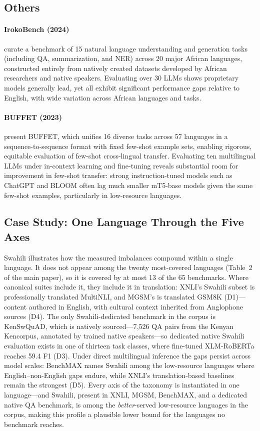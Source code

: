 \documentclass[letterpaper]{article}
\begin{document}
\subsection{Others}

\paragraph{IrokoBench (2024)} \citet{adelani2024irokobench} curate a benchmark of 15 natural language understanding and generation tasks (including QA, summarization, and NER) across 20 major African languages, constructed entirely from natively created datasets developed by African researchers and native speakers. Evaluating over 30 LLMs shows proprietary models generally lead, yet all exhibit significant performance gaps relative to English, with wide variation across African languages and tasks.

\paragraph{BUFFET (2023)} \citet{asai2023buffetbenchmarkinglargelanguage} present BUFFET, which unifies 16 diverse tasks across 57 languages in a sequence-to-sequence format with fixed few-shot example sets, enabling rigorous, equitable evaluation of few-shot cross-lingual transfer. Evaluating ten multilingual LLMs under in-context learning and fine-tuning reveals substantial room for improvement in few-shot transfer: strong instruction-tuned models such as ChatGPT and BLOOM often lag much smaller mT5-base models given the same few-shot examples, particularly in low-resource languages.

\subsection{Case Study: One Language Through the Five Axes}
\label{sec:swahili}
Swahili illustrates how the measured imbalances compound within a single language. It does not appear among the twenty most-covered languages (Table~2 of the main paper), so it is covered by at most 13 of the 65 benchmarks. Where canonical suites include it, they include it in translation: XNLI's Swahili subset is professionally translated MultiNLI, and MGSM's is translated GSM8K (D1)---content authored in English, with cultural context inherited from Anglophone sources (D4). The only Swahili-dedicated benchmark in the corpus is KenSwQuAD, which is natively sourced---7{,}526 QA pairs from the Kenyan Kencorpus, annotated by trained native speakers---so dedicated native Swahili evaluation exists in one of thirteen task classes, where fine-tuned XLM-RoBERTa reaches 59.4 F1 (D3). Under direct multilingual inference the gaps persist across model scales: BenchMAX names Swahili among the low-resource languages where English--non-English gaps endure, while XNLI's translation-based baselines remain the strongest (D5). Every axis of the taxonomy is instantiated in one language---and Swahili, present in XNLI, MGSM, BenchMAX, and a dedicated native QA benchmark, is among the \emph{better}-served low-resource languages in the corpus, making this profile a plausible lower bound for the languages no benchmark reaches.
\end{document}
